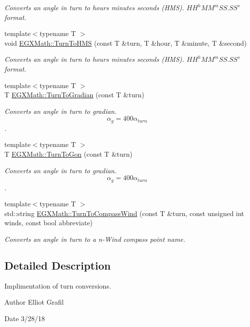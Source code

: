 \begin{DoxyCompactItemize}
\begin{DoxyCompactList}\small\item\em Converts an angle in turn to hours minutes seconds (H\+MS). ${HH}^h{MM}^m{SS.SS}^s$ format. \end{DoxyCompactList}\item 
{\footnotesize template$<$typename T $>$ }\\void \mbox{\hyperlink{group___e_g_x_math-_conversions-_angle_conversions-_turn_ga74efaece2f95aa6671f18382e5f3925f}{E\+G\+X\+Math\+::\+Turn\+To\+H\+MS}} (const T \&turn, T \&hour, T \&minute, T \&second)
\begin{DoxyCompactList}\small\item\em Converts an angle in turn to hours minutes seconds (H\+MS). ${HH}^h{MM}^m{SS.SS}^s$ format. \end{DoxyCompactList}\item 
{\footnotesize template$<$typename T $>$ }\\T \mbox{\hyperlink{group___e_g_x_math-_conversions-_angle_conversions-_turn_gad6aa9bdde2cde17cec136b24ee017bba}{E\+G\+X\+Math\+::\+Turn\+To\+Gradian}} (const T \&turn)
\begin{DoxyCompactList}\small\item\em Converts an angle in turn to gradian. \[\alpha_{g}=400\alpha_{turn}\]. \end{DoxyCompactList}\item 
{\footnotesize template$<$typename T $>$ }\\T \mbox{\hyperlink{group___e_g_x_math-_conversions-_angle_conversions-_turn_gad81dd0bb1660ef24e28fa15b2403dec7}{E\+G\+X\+Math\+::\+Turn\+To\+Gon}} (const T \&turn)
\begin{DoxyCompactList}\small\item\em Converts an angle in turn to gradian. \[\alpha_{g}=400\alpha_{turn}\]. \end{DoxyCompactList}\item 
{\footnotesize template$<$typename T $>$ }\\std\+::string \mbox{\hyperlink{group___e_g_x_math-_conversions-_angle_conversions-_turn_gaea42f973566f770cc3552831717f525e}{E\+G\+X\+Math\+::\+Turn\+To\+Compass\+Wind}} (const T \&turn, const unsigned int winds, const bool abbreviate)
\begin{DoxyCompactList}\small\item\em Converts an angle in turn to a n-\/\+Wind compass point name. \end{DoxyCompactList}\end{DoxyCompactItemize}


\subsection{Detailed Description}
Implimentation of turn conversions. 

\begin{DoxyAuthor}{Author}
Elliot Grafil 
\end{DoxyAuthor}
\begin{DoxyDate}{Date}
3/28/18 
\end{DoxyDate}
